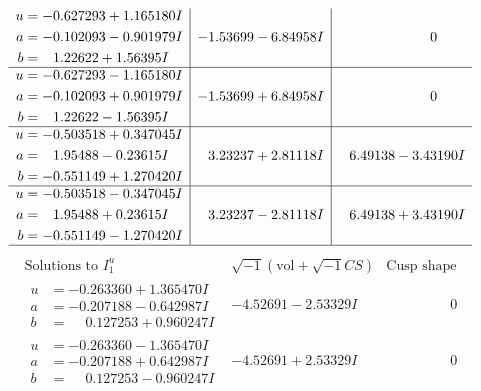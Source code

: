 \documentclass[1p]{elsarticle_modified}
\theoremstyle{definition}
\newcommand{\I}{\sqrt{-1}}
\begin{document}
$$\begin{array}{c|c|c}
\begin{aligned}
u &= -0.627293 + 1.165180 I \\
a &= -0.102093 - 0.901979 I \\
b &= \phantom{-}1.22622 + 1.56395 I\end{aligned}
 & -1.53699 - 6.84958 I & \phantom{-0.000000 } 0 \\ \hline\begin{aligned}
u &= -0.627293 - 1.165180 I \\
a &= -0.102093 + 0.901979 I \\
b &= \phantom{-}1.22622 - 1.56395 I\end{aligned}
 & -1.53699 + 6.84958 I & \phantom{-0.000000 } 0 \\ \hline\begin{aligned}
u &= -0.503518 + 0.347045 I \\
a &= \phantom{-}1.95488 - 0.23615 I \\
b &= -0.551149 + 1.270420 I\end{aligned}
 & \phantom{-}3.23237 + 2.81118 I & \phantom{-}6.49138 - 3.43190 I \\ \hline\begin{aligned}
u &= -0.503518 - 0.347045 I \\
a &= \phantom{-}1.95488 + 0.23615 I \\
b &= -0.551149 - 1.270420 I\end{aligned}
 & \phantom{-}3.23237 - 2.81118 I & \phantom{-}6.49138 + 3.43190 I\\
 \hline 
 \end{array}$$\newpage$$\begin{array}{c|c|c}  
\text{Solutions to }I^u_{1}& \I (\text{vol} + \sqrt{-1}CS) & \text{Cusp shape}\\
 \hline 
\begin{aligned}
u &= -0.263360 + 1.365470 I \\
a &= -0.207188 - 0.642987 I \\
b &= \phantom{-}0.127253 + 0.960247 I\end{aligned}
 & -4.52691 - 2.53329 I & \phantom{-0.000000 } 0 \\ \hline\begin{aligned}
u &= -0.263360 - 1.365470 I \\
a &= -0.207188 + 0.642987 I \\
b &= \phantom{-}0.127253 - 0.960247 I\end{aligned}
 & -4.52691 + 2.53329 I & \phantom{-0.000000 } 0 \\ \hline\begin{aligned}

\end{aligned}
\end{array}$$
\end{document}
